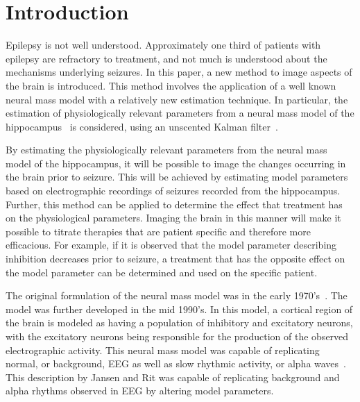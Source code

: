 \section{Introduction}


Epilepsy is not well understood. Approximately one third of patients with epilepsy are refractory to treatment, and not much is understood about the mechanisms underlying seizures. In this paper, a new method to image aspects of the brain is introduced. This method involves the application of a well known neural mass model with a relatively new estimation technique. In particular, the estimation of physiologically relevant parameters from a neural mass model of the hippocampus~\citep{wendling2002epileptic} is considered, using an unscented Kalman filter~\citep{voss2004nonlinear}. 

By estimating the physiologically relevant parameters from the neural mass model of the hippocampus, it will be possible to image the changes occurring in the brain prior to seizure. This will be achieved by estimating model parameters based on electrographic recordings of seizures recorded from the hippocampus. Further, this method can be applied to determine the effect that treatment has on the physiological parameters. Imaging the brain in this manner will make it possible to titrate therapies that are patient specific and therefore more efficacious. For example, if it is observed that the model parameter describing inhibition decreases prior to seizure, a treatment that has the opposite effect on the model parameter can be determined and used on the specific patient.


The original formulation of the neural mass model was in the early 1970's~\citep{lopes1974model,freeman1963electrical}. The model was further developed in the mid 1990's. In this model, a cortical region of the brain is modeled as having a population of inhibitory and excitatory neurons, with the excitatory neurons being responsible for the production of the observed electrographic activity. This neural mass model was capable of replicating normal, or background, EEG as well as slow rhythmic activity, or alpha waves~\citep{jansen1995electroencephalogram}. This description by Jansen and Rit was capable of replicating background and alpha rhythms observed in EEG by altering model parameters.

